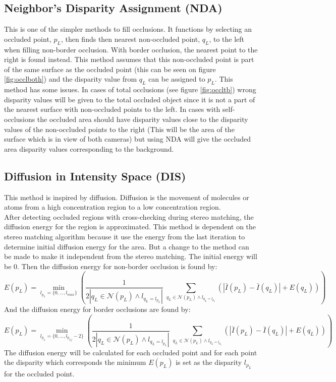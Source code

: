 \subsection{Neighbor's Disparity Assignment (NDA)}\label{sec:nda}
This is one of the simpler methods to fill occlusions. It functions by selecting an occluded point, $p_L$, then finds then nearest non-occluded point, $q_L$, to the left when filling non-border occlusion. With border occlusion, the nearest point to the right is found instead. This method assumes that this non-occluded point is part of the same surface as the occluded point (this can be seen on figure \ref{fig:occlboth}) and the disparity value from $q_L$ can be assigned to $p_L$. This method has some issues. In cases of total occlusions (see figure \ref{fig:occltb}) wrong disparity values will be given to the total occluded object since it is not a part of the nearest surface with non-occluded points to the left. In cases with self-occlusions the occluded area should have disparity values close to the disparity values of the non-occluded points to the right (This will be the area of the surface which is in view of both cameras) but using NDA will give the occluded area disparity values corresponding to the background.

\subsection{Diffusion in Intensity Space (DIS)}
This method is inspired by diffusion. Diffusion is the movement of molecules or atoms from a high concentration region to a low concentration region. \\

After detecting occluded regions with cross-checking during stereo matching, the diffusion energy for the region is approximated. This method is dependent on the stereo matching algorithm because it use the energy from the last iteration to determine initial diffusion energy for the area. But a change to the method can be made to make it independent from the stereo matching. The initial energy will be 0. Then the diffusion energy for non-border occlusion is found by:
\begin{equation}
E(p_L) = \min_{l_{p_L}=\{0,\dots, l_{max}\}} \left( \dfrac{1}{2 | q_L \in \mathcal{N}(p_L) \wedge l_{q_L=l_{p_L}} |} \; \sum_{q_L \in \mathcal{N}(p_L) \wedge l_{q_L = l_{p_L}}} (|\bar{I}(p_L)-\bar{I}(q_L) | + E(q_L))\right)
\end{equation}
And the diffusion energy for border occlusions are found by:
\begin{equation}
E(p_L) = \min_{l_{p_L}=\{0,\dots, l_{p_{Lf}}-2\}} \left( \dfrac{1}{2 | q_L \in \mathcal{N}(p_L) \wedge l_{q_L=l_{p_L}} |} \; \sum_{q_L \in \mathcal{N}(p_L) \wedge l_{q_L = l_{p_L}}} (|\bar{I}(p_L)-\bar{I}(q_L) | + E(q_L))\right)
\end{equation}
The diffusion energy will be calculated for each occluded point and for each point the disparity which corresponds the minimum $E(p_L)$ is set as the disparity $l_{p_L}$ for the occluded point.

